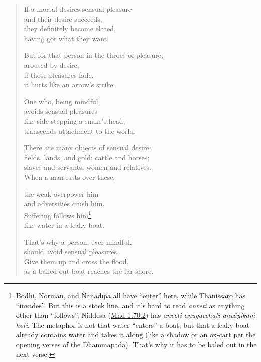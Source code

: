 \documentclass[12pt,openany]{book}%
\begin{document}
\begin{verse}%
If a mortal desires sensual pleasure \\
and their desire succeeds, \\
they definitely become elated, \\
having got what they want. 

But for that person in the throes of pleasure, \\
aroused by desire, \\
if those pleasures fade, \\
it hurts like an arrow’s strike. 

One who, being mindful, \\
avoids sensual pleasures \\
like side-stepping a snake’s head, \\
transcends attachment to the world. 

There are many objects of sensual desire: \\
fields, lands, and gold; cattle and horses; \\
slaves and servants; women and relatives. \\
When a man lusts over these, 

the weak overpower him \\
and adversities crush him. \\
Suffering follows him\footnote{Bodhi, Norman, and \textsanskrit{Ñāṇadīpa} all have “enter” here, while Thanissaro has “invades”. But this is a stock line, and it’s hard to read \textit{anveti} as anything other than “follows”. Niddesa (\href{https://suttacentral.net/mnd1/en/sujato\#70.2}{Mnd 1:70.2}) has \textit{anveti anugacchati \textsanskrit{anvāyikaṁ} hoti}. The metaphor is not that water “enters” a boat, but that a leaky boat already contains water and takes it along (like a shadow or an ox-cart per the opening verses of the Dhammapada). That’s why it has to be baled out in the next verse. } \\
like water in a leaky boat. 

That’s why a person, ever mindful, \\
should avoid sensual pleasures. \\
Give them up and cross the flood, \\
as a bailed-out boat reaches the far shore. 

%
\end{verse}
\end{document}
